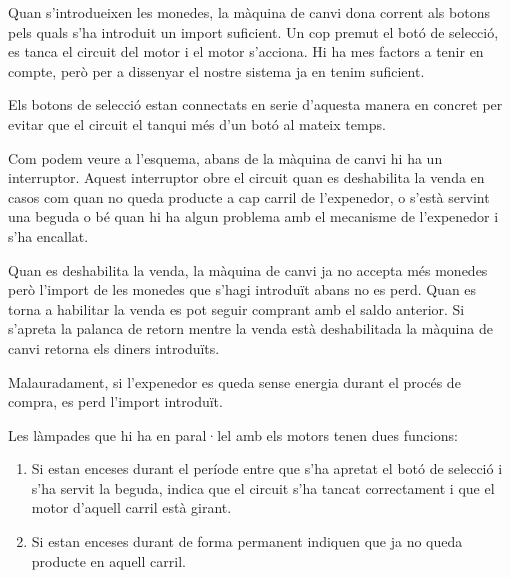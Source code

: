 Quan s'introdueixen les monedes, la màquina de canvi dona corrent als botons pels quals s'ha introduit un import suficient. Un cop premut el botó de selecció, es tanca el circuit del motor i el motor s'acciona. Hi ha mes factors a tenir en compte, però per a dissenyar el nostre sistema ja en tenim suficient.

Els botons de selecció estan connectats en serie d'aquesta manera en concret per evitar que el circuit el tanqui més d'un botó al mateix temps.

Com podem veure a l'esquema, abans de la màquina de canvi hi ha un interruptor. Aquest interruptor obre el circuit quan es deshabilita la venda en casos com quan no queda producte a cap carril de l'expenedor, o s'està servint una beguda o bé quan hi ha algun problema amb el mecanisme de l'expenedor i s'ha encallat.

Quan es deshabilita la venda, la màquina de canvi ja no accepta més monedes però l'import de les monedes que s'hagi introduït abans no es perd. Quan es torna a habilitar la venda es pot seguir comprant amb el saldo anterior. Si s'apreta la palanca de retorn  mentre la venda està deshabilitada la màquina de canvi retorna els diners introduïts.

Malauradament, si l'expenedor es queda sense energia durant el procés de compra, es perd l'import introduït.

Les làmpades que hi ha en paral·lel amb els motors tenen dues funcions:
\begin{enumerate}
\item Si estan enceses durant el període entre que s'ha apretat el botó de selecció i s'ha servit la beguda, indica que el circuit s'ha tancat correctament i que el motor d'aquell carril està girant.
\item Si estan enceses durant de forma permanent indiquen que ja no queda producte en aquell carril.
\end{enumerate}
